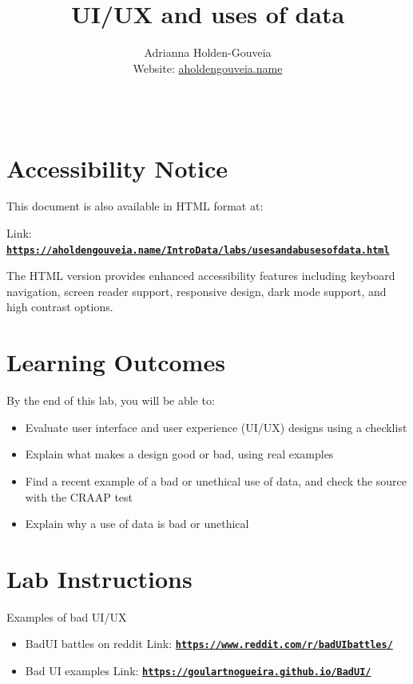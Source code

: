 \documentclass[12pt]{article}
\title{UI/UX and uses of data}
\author{
        Adrianna Holden-Gouveia \\
        Website: \href{https://aholdengouveia.name}{aholdengouveia.name}\\ 
        \date{\vspace{-5ex}}
        \faGithub {: aholdengouveia} \\
        }
\begin{document}
    

\maketitle



\section*{Accessibility Notice}
This document is also available in HTML format at:

Link: \href{https://aholdengouveia.name/IntroData/labs/usesandabusesofdata.html}{\textbf{\nolinkurl{https://aholdengouveia.name/IntroData/labs/usesandabusesofdata.html}}}

The HTML version provides enhanced accessibility features including keyboard navigation, screen reader support, responsive design, dark mode support, and high contrast options.

\section*{Learning Outcomes}
By the end of this lab, you will be able to:
\begin{itemize}
    \item Evaluate user interface and user experience (UI/UX) designs using a checklist
    \item Explain what makes a design good or bad, using real examples
    \item Find a recent example of a bad or unethical use of data, and check the source with the CRAAP test
    \item Explain why a use of data is bad or unethical
\end{itemize}

\section*{Lab Instructions}


Examples of bad UI/UX
\begin{itemize}
    \item BadUI battles on reddit Link: \href{https://www.reddit.com/r/badUIbattles/}{\textbf{\nolinkurl{https://www.reddit.com/r/badUIbattles/}}}
    \item Bad UI examples Link: \href{https://goulartnogueira.github.io/BadUI/}{\textbf{\nolinkurl{https://goulartnogueira.github.io/BadUI/}}}
\end{itemize}    
\end{document}
